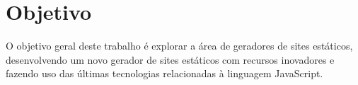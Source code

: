 \documentclass[ppginf, pep]{esinucpel}
\begin{document}
%
%
%
%
%
%






\chapter{Objetivo}

O objetivo geral deste trabalho é explorar a área de geradores de sites estáticos, desenvolvendo um novo gerador de sites estáticos com recursos inovadores e fazendo uso das últimas tecnologias relacionadas à linguagem JavaScript.
\end{document}
